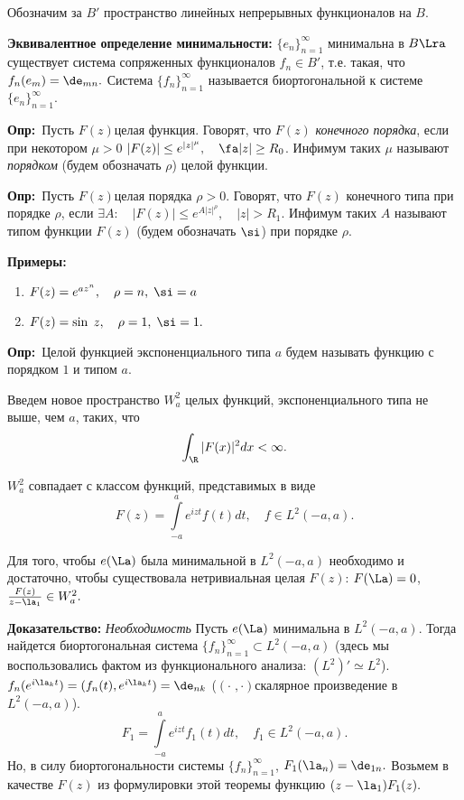 \documentclass[a4paper]{article}
\def\defin{\noindent\textbf{Опр:}\ }
\begin{document}
Обозначим за $B'$ пространство линейных непрерывных функционалов
на $B.$

\noindent\textbf{Эквивалентное определение минимальности:}
$\{e_n\}_{n=1}^{\infty}$ минимальна в $B\Lra$
существует система сопряженных функционалов $f_n\in B'$, т.е.
такая, что $f_n(e_m)=\de_{mn}.$ Система
$\{f_n\}_{n=1}^{\infty}$ называется биортогональной к системе
$\{e_n\}_{n=1}^{\infty}.$

\defin Пусть $F(z)$\т целая функция. Говорят, что
$F(z)$ \emph{конечного порядка}, если при некотором $\mu>0$
$|F(z)|\le e^{|z|^{\mu}},\quad\fa |z|\ge R_0$. Инфимум таких
$\mu$ называют \emph{порядком} (будем обозначать $\rho$) целой
функции.

\defin Пусть $F(z)$\т целая порядка $\rho>0.$
Говорят, что $F(z)$ конечного типа при порядке $\rho$, если
$\exi A:\quad|F(z)|\le e^{A|z|^{\rho}},\quad|z|>R_1.$ Инфимум
таких $A$ называют типом функции $F(z)$ (будем обозначать
$\si$) при порядке $\rho.$

\noindent\textbf{Примеры:}
\begin{enumerate}
\item
$F(z)=e^{az^n},\quad\rho=n,\;\si=a$
\item
$F(z)=\sin\;z,\quad\rho=1,\;\si=1.$
\end{enumerate}

\defin Целой функцией экспоненциального типа $a$
будем называть функцию с порядком $1$ и типом $a$.

Введем новое пространство $W^2_a$ целых функций, экспоненциального
типа не выше, чем $a$, таких, что
$$\int_{\R }|F(x)|^2dx<\infty.$$

\begin{theorems}
$W^2_a$ совпадает с классом функций, представимых в виде
$$F(z)=\int\limits_{-a}^ae^{izt}f(t)dt,\quad f\in L^2(-a,a).$$
\end{theorems}

\begin{theorems}
Для того, чтобы $e(\La)$ была минимальной в $L^2(-a,a)$
необходимо и достаточно, чтобы существовала нетривиальная целая
$F(z)$: $F(\La)=0$, $\frac {F(z)}{z-\la_1}\in W^2_a.$
\end{theorems}
\textbf{Доказательство:} \emph{Необходимость} Пусть $e(\La)$
минимальна в $L^2(-a,a)$. Тогда найдется биортогональная система
$\{f_n\}_{n=1}^{\infty}\subset L^2(-a,a)$ (здесь мы
воспользовались фактом из функционального анализа: $(L^2)'\simeq
L^2$). $f_n(e^{i\la_k t})=(f_n(t),e^{i\la_k
t})=\de_{nk}$ ($(\cdot\;,\cdot)$\т скалярное произведение в
$L^2(-a,a)$).
$$F_1=\int\limits_{-a}^ae^{izt}f_1(t)dt,\quad f_1\in L^2(-a,a).$$
Но, в силу биортогональности системы $\{f_n\}_{n=1}^{\infty}$,
$F_1(\la_n)=\de_{1n}.$ Возьмем в качестве $F(z)$ из
формулировки этой теоремы функцию $(z-\la_1)F_1(z).$
\end{document}

